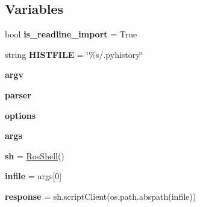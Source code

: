 \subsection*{Variables}
\begin{DoxyCompactItemize}
\item 
bool {\bfseries is\+\_\+readline\+\_\+import} = True\hypertarget{namespaceros__nodes_1_1run__command_a8c81f5da0879a356edf1f353a992cc49}{}\label{namespaceros__nodes_1_1run__command_a8c81f5da0879a356edf1f353a992cc49}

\item 
string {\bfseries H\+I\+S\+T\+F\+I\+LE} = \char`\"{}\%s/.pyhistory\char`\"{}\hypertarget{namespaceros__nodes_1_1run__command_a61cc47de1b2e6809ae95e6b7df7e570d}{}\label{namespaceros__nodes_1_1run__command_a61cc47de1b2e6809ae95e6b7df7e570d}

\item 
{\bfseries argv}\hypertarget{namespaceros__nodes_1_1run__command_ac96f1c294275aa51505b6c68b0f1e162}{}\label{namespaceros__nodes_1_1run__command_ac96f1c294275aa51505b6c68b0f1e162}

\item 
{\bfseries parser}
\item 
{\bfseries options}\hypertarget{namespaceros__nodes_1_1run__command_add36f1268a906a6ed13437e19918865c}{}\label{namespaceros__nodes_1_1run__command_add36f1268a906a6ed13437e19918865c}

\item 
{\bfseries args}\hypertarget{namespaceros__nodes_1_1run__command_a61f7bb3f42fb53eeb412476f3761d162}{}\label{namespaceros__nodes_1_1run__command_a61f7bb3f42fb53eeb412476f3761d162}

\item 
{\bfseries sh} = \hyperlink{classros__nodes_1_1run__command_1_1RosShell}{Ros\+Shell}()\hypertarget{namespaceros__nodes_1_1run__command_aa061bbb2e8964b1eee0ba485e6939032}{}\label{namespaceros__nodes_1_1run__command_aa061bbb2e8964b1eee0ba485e6939032}

\item 
{\bfseries infile} = args\mbox{[}0\mbox{]}\hypertarget{namespaceros__nodes_1_1run__command_a0123ee91007e94366e2e02ba59bff4ec}{}\label{namespaceros__nodes_1_1run__command_a0123ee91007e94366e2e02ba59bff4ec}

\item 
{\bfseries response} = sh.\+script\+Client(os.\+path.\+abspath(infile))\hypertarget{namespaceros__nodes_1_1run__command_aade7ac8fdbc56b752ab8f62f3ccebdda}{}\label{namespaceros__nodes_1_1run__command_aade7ac8fdbc56b752ab8f62f3ccebdda}

\end{DoxyCompactItemize}


